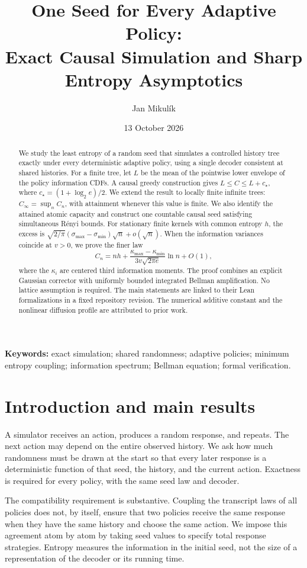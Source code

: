 \documentclass[11pt,a4paper]{article}
\title{One Seed for Every Adaptive Policy:\\Exact Causal Simulation and Sharp Entropy Asymptotics}
\author{Jan Mikul\'ik}
\date{13 October 2026}
\theoremstyle{definition}\newtheorem{definition}[theorem]{Definition}
\theoremstyle{remark}\newtheorem{remark}[theorem]{Remark}
\numberwithin{equation}{section}
\begin{document}
\maketitle
\begin{abstract}
We study the least entropy of a random seed that simulates a controlled
history tree exactly under every deterministic adaptive policy, using a
single decoder consistent at shared histories. For a finite tree, let $L$
be the mean of the pointwise lower envelope of the policy information
CDFs. A causal greedy construction gives $L\le C\le L+c_\star$, where
$c_\star=(1+\log_2 e)/2$. We extend the result to locally finite infinite
trees: $C_\infty=\sup_n C_n$, with attainment whenever this value is finite.
We also identify the attained atomic capacity and construct one countable
causal seed satisfying simultaneous R\'enyi bounds.
For stationary finite kernels with common entropy $h$, the excess is
$\sqrt{2/\pi}(\sigma_{\max}-\sigma_{\min})\sqrt n+o(\sqrt n)$.
When the information variances coincide at $v>0$, we prove the finer law
\[
 C_n=nh+\frac{\kappa_{\max}-\kappa_{\min}}{3v\sqrt{2\pi e}}\ln n+O(1),
\]
where the $\kappa_i$ are centered third information moments. The proof
combines an explicit Gaussian corrector with uniformly bounded integrated
Bellman amplification. No lattice assumption is required. The main
statements are linked to their Lean formalizations in a fixed repository
revision. The numerical additive constant and the nonlinear diffusion
profile are attributed to prior work.
\end{abstract}
\noindent\textbf{Keywords:} exact simulation; shared randomness; adaptive policies;
minimum entropy coupling; information spectrum; Bellman equation; formal verification.
\setcounter{tocdepth}{1}
\tableofcontents
\clearpage

\section{Introduction and main results}\label{sec:intro}
A simulator receives an action, produces a random response, and repeats.
The next action may depend on the entire observed history. We ask how much
randomness must be drawn at the start so that every later response is a
deterministic function of that seed, the history, and the current action.
Exactness is required for every policy, with the same seed law and decoder.

The compatibility requirement is substantive. Coupling the transcript
laws of all policies does not, by itself, ensure that two policies receive
the same response when they have the same history and choose the same
action. We impose this agreement atom by atom by taking seed values to
specify total response strategies. Entropy measures the information in
the initial seed, not the size of a representation of the decoder or its
running time.
\end{document}
